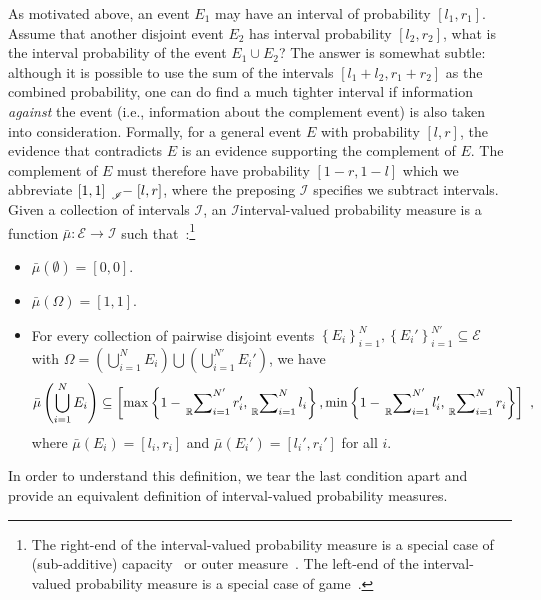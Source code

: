 \documentclass{article}
\theoremstyle{remark}
\newcommand{\events}{\ensuremath{\mathcal{E}}}
\begin{document}
As motivated above, an event $E_{1}$ may have an interval of probability
$[l_{1},r_{1}]$. Assume that another disjoint event $E_{2}$ has
interval probability $[l_{2},r_{2}]$, what is the interval probability
of the event $E_{1}\cup E_{2}$? The answer is somewhat subtle: although
it is possible to use the sum of the intervals $[l_{1}+l_{2},r_{1}+r_{2}]$
as the combined probability, one can do find a much tighter interval
if information \emph{against} the event (i.e., information about the
complement event) is also taken into consideration. Formally, for
a general event $E$ with probability $[l,r]$, the evidence that
contradicts $E$ is an evidence supporting the complement of $E$.
The complement of $E$ must therefore have probability $\left[1-r,1-l\right]$
which we abbreviate $\left[1,1\right]\tensor*[_{\mathscr{I}}]{-}{}\left[l,r\right]$,
where the preposing $\mathscr{I}$ specifies we subtract intervals.
Given a collection of intervals $\mathscr{I}$, an $\mathscr{I}$\textendash interval-valued
probability measure is a function $\bar{\mu}:\events\rightarrow\mathscr{I}$
such that~\cite{JamisonLodwick2004}:\footnote{The right-end of the interval-valued probability measure is a special
case of (sub-additive) capacity~\cite{Choquet1954,Graf1980,Goodman2013}
or outer measure~\cite{Folland2013}. The left-end of the interval-valued
probability measure is a special case of game~\cite{Shapley1965}.} 
\begin{itemize}
\item $\bar{\mu}(\emptyset)=[0,0]$. 
\item $\bar{\mu}(\Omega)=[1,1]$. 
\item For every collection of pairwise disjoint events $\left\{ E_{i}\right\} _{i=1}^{N},\left\{ E_{i}'\right\} _{i=1}^{N'}\subseteq\events$
with $\Omega=\left(\bigcup_{i=1}^{N}E_{i}\right)\bigcup\left(\bigcup_{i=1}^{N'}E_{i}'\right)$,
we have 
\[
\bar{\mu}\left(\bigcup_{i=1}^{N}E_{i}\right)\subseteq\left[\max\left\{ 1-\sideset{_{\mathbb{R}}}{_{i=1}^{N'}}\sum r_{i}',\sideset{_{\mathbb{R}}}{_{i=1}^{N}}\sum l_{i}\right\} ,\min\left\{ 1-\sideset{_{\mathbb{R}}}{_{i=1}^{N'}}\sum l_{i}',\sideset{_{\mathbb{R}}}{_{i=1}^{N}}\sum r_{i}\right\} \right]\textrm{ ,}
\]
where $\bar{\mu}\left(E_{i}\right)=[l_{i},r_{i}]$ and $\bar{\mu}\left(E_{i}'\right)=[l_{i}',r_{i}']$
for all $i$.
\end{itemize}
In order to understand this definition, we tear the last condition
apart and provide an equivalent definition of interval-valued probability
measures.
\end{document}
